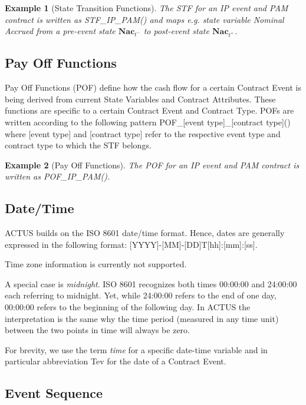 \documentclass[9pt,oneside]{amsart}
\newtheorem{example}{Example}
\newcommand{\svar}[2]{\textbf{#1}_{#2}}
\newcommand{\stf}[2]{STF\_#1\_#2()}
\newcommand{\pof}[2]{POF\_#1\_#2()}
\begin{document}
\begin{multicols}{2}
\begin{example}[State Transition Functions]
The STF for an IP event and PAM contract is written as \stf{IP}{PAM} and maps e.g. state variable \textit{Nominal Accrued} from a pre-event state $\svar{Nac}{t^-}$ to post-event state $\svar{Nac}{t^+}$.
\end{example}


\subsection{Pay Off Functions}

Pay Off Functions (POF) define how the cash flow for a certain Contract Event is being derived from current State Variables and Contract Attributes. These functions are specific to a certain Contract Event and Contract Type. POFs are written according to the following pattern \pof{[event type]}{[contract type]} where [event type] and [contract type] refer to the respective event type and contract type to which the STF belongs.

\begin{example}[Pay Off Functions]
The POF for an IP event and PAM contract is written as \pof{IP}{PAM}.
\end{example}


\subsection{Date/Time}

ACTUS builds on the ISO 8601 date/time format. Hence, dates are generally expressed in the following format: [YYYY]-[MM]-[DD]T[hh]:[mm]:[ss].

Time zone information is currently not supported.

A special case is \textit{midnight}. ISO 8601 recognizes both times 00:00:00 and 24:00:00 each referring to midnight. Yet, while 24:00:00 refers to the end of one day, 00:00:00 refers to the beginning of the following day. In ACTUS the interpretation is the same why the time period (measured in any time unit) between the two points in time will always be zero. 

For brevity, we use the term \textit{time} for a specific date-time variable and in particular abbreviation Tev for the date of a Contract Event.


\subsection{Event Sequence}


\end{multicols}
\end{document}

